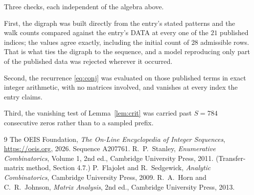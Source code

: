 \documentclass[11pt,a4paper]{article}
\theoremstyle{plain}
\theoremstyle{definition}
\begin{document}
Three checks, each independent of the algebra above.

First, the digraph was built directly from the entry's stated patterns and the walk counts
compared against the entry's DATA at every one of the $21$ published indices; the
values agree exactly, including the initial count of $28$ admissible rows. That is
what ties the digraph to the sequence, and a model reproducing only part of the published
data was rejected wherever it occurred.

Second, the recurrence \eqref{eq:conj} was evaluated on those published terms in exact
integer arithmetic, with no matrices involved, and vanishes at every index the entry claims.

Third, the vanishing test of Lemma~\ref{lem:crit} was carried past $S=784$ consecutive
zeros rather than to a sampled prefix.

\begin{thebibliography}{9}
 The OEIS Foundation, \emph{The On-Line Encyclopedia of Integer
Sequences}, \url{https://oeis.org}, 2026. Sequence A207761.
 R.~P.~Stanley, \emph{Enumerative Combinatorics}, Volume 1, 2nd ed.,
Cambridge University Press, 2011. (Transfer-matrix method, Section 4.7.)
 P.~Flajolet and R.~Sedgewick, \emph{Analytic Combinatorics}, Cambridge
University Press, 2009.
 R.~A.~Horn and C.~R.~Johnson, \emph{Matrix Analysis}, 2nd ed., Cambridge
University Press, 2013.
\end{thebibliography}
\end{document}
